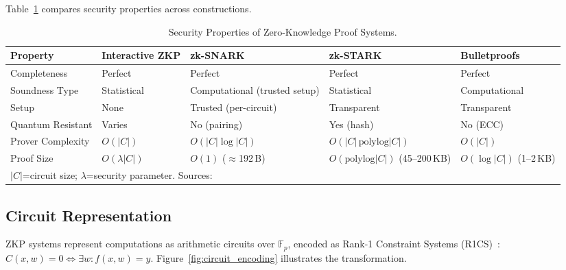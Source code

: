 \documentclass[sigconf,nonacm]{acmart}
\begin{document}
Table~\ref{tab:security_properties} compares security properties across constructions.

\begin{table}[t]
\caption{Security Properties of Zero-Knowledge Proof Systems.}
\label{tab:security_properties}
\small
\setlength{\tabcolsep}{4pt}
\begin{tabularx}{\textwidth}{@{}p{2.8cm}XXXX@{}}
\toprule
\textbf{Property} & \textbf{Interactive ZKP} & \textbf{zk-SNARK} &
\textbf{zk-STARK} & \textbf{Bulletproofs} \\
\midrule
Completeness      & Perfect & Perfect & Perfect & Perfect \\
Soundness Type    & Statistical & Computational (trusted setup) & Statistical & Computational \\
Setup             & None & Trusted (per-circuit) & Transparent & Transparent \\
Quantum Resistant & Varies & No (pairing) & Yes (hash) & No (ECC) \\
Prover Complexity & $O(|C|)$ & $O(|C|\log|C|)$ & $O(|C|\,\text{polylog}|C|)$ & $O(|C|)$ \\
Proof Size        & $O(\lambda|C|)$ & $O(1)$ ($\approx$192\,B) & $O(\text{polylog}|C|)$ (45--200\,KB) & $O(\log|C|)$ (1--2\,KB) \\
\bottomrule
\multicolumn{5}{l}{\footnotesize $|C|$=circuit size; $\lambda$=security parameter. Sources:~\cite{zkp_comparison_2023,protocol_analysis_2024}} \\
\end{tabularx}
\end{table}

\subsection{Circuit Representation}

ZKP systems represent computations as arithmetic circuits over $\mathbb{F}_p$, encoded
as Rank-1 Constraint Systems (R1CS)~\cite{circuit_representation_2022}:
$C(x,w)=0 \iff \exists w: f(x,w)=y$.
Figure~\ref{fig:circuit_encoding} illustrates the transformation.
\end{document}
